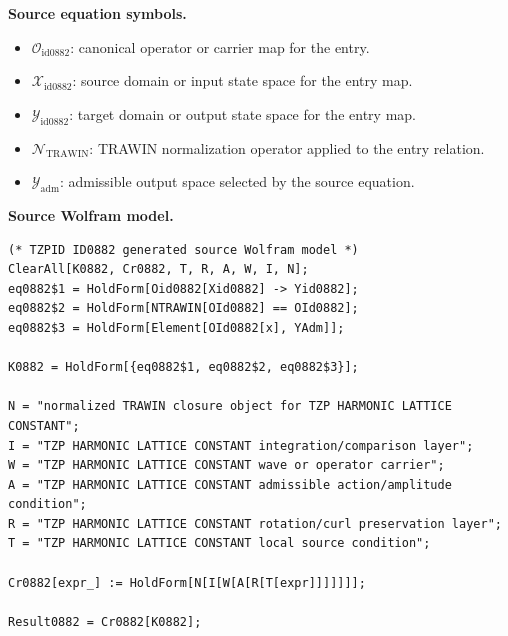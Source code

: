 \begin{minipage}[t]{0.49\linewidth}
\begingroup
\small
\raggedright
\textbf{Source equation symbols.}\par
\begin{itemize}[leftmargin=1.35em,itemsep=1pt,topsep=1pt,parsep=0pt]
    \item $\mathcal{O}_{\mathrm{id0882}}$: canonical operator or carrier map for the entry.
    \item $\mathcal{X}_{\mathrm{id0882}}$: source domain or input state space for the entry map.
    \item $\mathcal{Y}_{\mathrm{id0882}}$: target domain or output state space for the entry map.
    \item $\mathcal{N}_{\mathrm{TRAWIN}}$: TRAWIN normalization operator applied to the entry relation.
    \item $\mathcal{Y}_{\mathrm{adm}}$: admissible output space selected by the source equation.
\end{itemize}
\endgroup
\end{minipage}\hfill
\begin{minipage}[t]{0.47\linewidth}
\begingroup
\scriptsize
\raggedright
\textbf{Source Wolfram model.}\par
\begin{Verbatim}[fontsize=\tiny,breaklines=true,breakanywhere=true]
(* TZPID ID0882 generated source Wolfram model *)
ClearAll[K0882, Cr0882, T, R, A, W, I, N];
eq0882$1 = HoldForm[Oid0882[Xid0882] -> Yid0882];
eq0882$2 = HoldForm[NTRAWIN[OId0882] == OId0882];
eq0882$3 = HoldForm[Element[OId0882[x], YAdm]];

K0882 = HoldForm[{eq0882$1, eq0882$2, eq0882$3}];

N = "normalized TRAWIN closure object for TZP HARMONIC LATTICE CONSTANT";
I = "TZP HARMONIC LATTICE CONSTANT integration/comparison layer";
W = "TZP HARMONIC LATTICE CONSTANT wave or operator carrier";
A = "TZP HARMONIC LATTICE CONSTANT admissible action/amplitude condition";
R = "TZP HARMONIC LATTICE CONSTANT rotation/curl preservation layer";
T = "TZP HARMONIC LATTICE CONSTANT local source condition";

Cr0882[expr_] := HoldForm[N[I[W[A[R[T[expr]]]]]]];

Result0882 = Cr0882[K0882];
\end{Verbatim}
\endgroup
\end{minipage}

